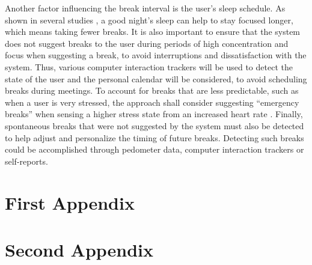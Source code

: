 \documentclass{hasel_thesis}
\begin{document}
Another factor influencing the break interval is the user's sleep schedule. As shown in several studies \cite{Rosekind.2010} \cite{Gingerich.2017} \cite{Choi.2018}, a good night's sleep  can help to stay focused longer, which means taking fewer breaks. 
It is also important to ensure that the system does not suggest breaks to the user during periods of high concentration and focus when suggesting a break, to avoid interruptions and dissatisfaction with the system. Thus, various computer interaction trackers will be used to detect the state of the user and the personal calendar will be considered, to avoid scheduling breaks during meetings. 
To account for breaks that are less predictable, such as when a user is very stressed, the approach shall consider suggesting “emergency breaks” when sensing a higher stress state from an increased heart rate \cite{Hjortskov.2004}. 
Finally, spontaneous breaks that were not suggested by the system must also be detected to help adjust and personalize the timing of future breaks. Detecting such breaks could be accomplished through pedometer data, computer interaction trackers or self-reports. 



% 



\appendix
\chapter{First Appendix}
\chapter{Second Appendix}

\backmatter


\end{document}
